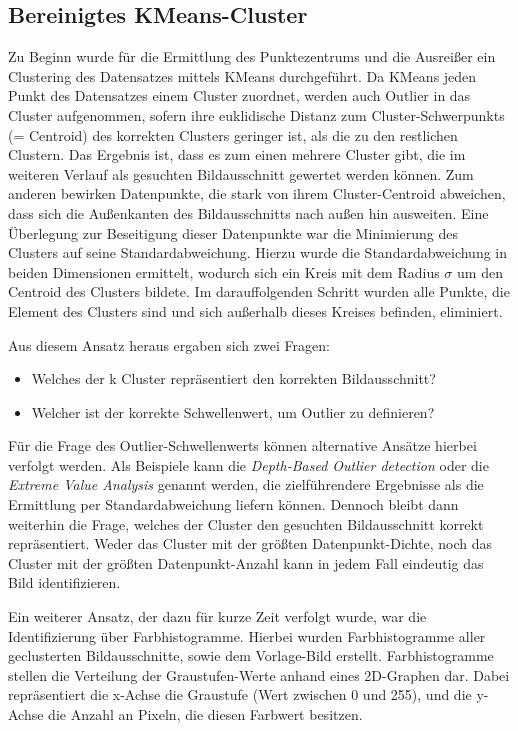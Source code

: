\documentclass[
    type=Prakikumsbericht,
    status=draft, %
    language=german, %
    bibengine=bibtex,
]{unibwm-inf-thesis}
\begin{document}
    \subsection{Bereinigtes KMeans-Cluster}
    Zu Beginn wurde für die Ermittlung des Punktezentrums und die Ausreißer ein Clustering des Datensatzes mittels KMeans durchgeführt.
    Da KMeans jeden Punkt des Datensatzes einem Cluster zuordnet, werden auch Outlier in das Cluster aufgenommen,
    sofern ihre euklidische Distanz zum Cluster-Schwerpunkts (= Centroid) des korrekten Clusters geringer ist, als die zu den restlichen Clustern.
    Das Ergebnis ist, dass es zum einen mehrere Cluster gibt, die im weiteren Verlauf als gesuchten Bildausschnitt gewertet werden können.
    Zum anderen bewirken Datenpunkte, die stark von ihrem Cluster-Centroid abweichen, dass sich die Außenkanten des Bildausschnitts nach außen hin ausweiten.
    Eine Überlegung zur Beseitigung dieser Datenpunkte war die Minimierung des Clusters auf seine Standardabweichung.
    Hierzu wurde die Standardabweichung in beiden Dimensionen ermittelt, wodurch sich ein Kreis mit dem Radius $\sigma$ um den Centroid des Clusters bildete.
    Im darauffolgenden Schritt wurden alle Punkte, die Element des Clusters sind und sich außerhalb dieses Kreises befinden, eliminiert.

    Aus diesem Ansatz heraus ergaben sich zwei Fragen:
    \begin{itemize}
        \item Welches der k Cluster repräsentiert den korrekten Bildausschnitt?
        \item Welcher ist der korrekte Schwellenwert, um Outlier zu definieren?
    \end{itemize}

    Für die Frage des Outlier-Schwellenwerts können alternative Ansätze hierbei verfolgt werden.
    Als Beispiele kann die \textit{Depth-Based Outlier detection} oder die \textit{Extreme Value Analysis} genannt werden, die zielführendere Ergebnisse als die Ermittlung per Standardabweichung liefern können.
    Dennoch bleibt dann weiterhin die Frage, welches der Cluster den gesuchten Bildausschnitt korrekt repräsentiert.
    Weder das Cluster mit der größten Datenpunkt-Dichte, noch das Cluster mit der größten Datenpunkt-Anzahl kann in jedem Fall eindeutig das Bild identifizieren.

    Ein weiterer Ansatz, der dazu für kurze Zeit verfolgt wurde, war die Identifizierung über Farbhistogramme.
    Hierbei wurden Farbhistogramme aller geclusterten Bildausschnitte, sowie dem Vorlage-Bild erstellt.
    Farbhistogramme stellen die Verteilung der Graustufen-Werte anhand eines 2D-Graphen dar.
    Dabei repräsentiert die x-Achse die Graustufe (Wert zwischen 0 und 255), und die y-Achse die Anzahl an Pixeln, die diesen Farbwert besitzen.
\end{document}
